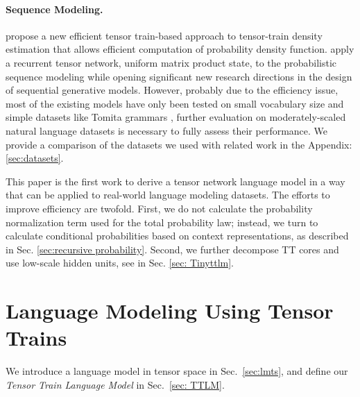 \documentclass{article}
\theoremstyle{plain}
\theoremstyle{definition}
\theoremstyle{remark}
\begin{document}
\paragraph{Sequence Modeling.} \cite{novikov2021tensor} propose a new efficient tensor train-based approach to tensor-train density estimation that allows efficient computation of probability density function. \cite{miller2021tensor} apply a recurrent tensor network, uniform matrix product state, to the probabilistic sequence modeling while opening significant new research directions in the design of sequential generative models. However, probably due to the efficiency issue, most of the existing models have only been tested on small vocabulary size and simple datasets like Tomita grammars \citep{tomita1982dynamic}, further evaluation on moderately-scaled natural language datasets is necessary to fully assess their performance. We provide a comparison of the datasets we used with related work in the Appendix: \ref{sec:datasets}.

This paper is the first work to  derive a tensor network language model in a way that can be applied to real-world language modeling datasets. The efforts to improve efficiency are twofold. First, we do not calculate the probability normalization term used for the total probability law; instead, we turn to  calculate conditional probabilities based on context representations, as described in Sec. \ref{sec:recursive probability}.
Second, we further decompose TT cores and use  low-scale hidden units, see in Sec. \ref{sec: Tinyttlm}.




\section{Language Modeling Using Tensor Trains}
\label{sec:ttlm}

We introduce a language model in tensor space in Sec.\ \ref{sec:lmts}, and define our \emph{Tensor Train Language Model} in Sec.\ \ref{sec: TTLM}. 



\end{document}
